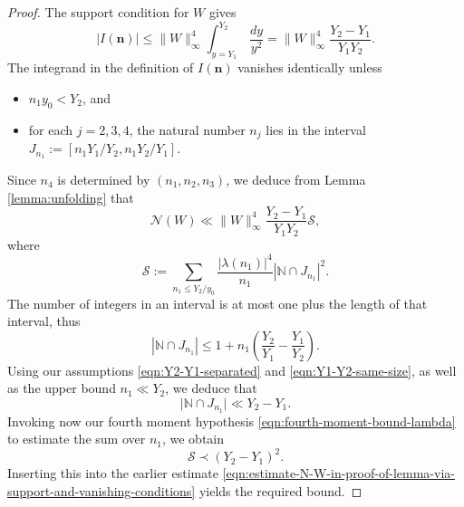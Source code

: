 \documentclass[reqno]{amsart} 
\begin{document}
\begin{proof}
  The support condition for $W$ gives
  \begin{equation*}
    \lvert I(\mathbf{n}) \rvert \leq \lVert W \rVert_{\infty}^4
    \int _{y = Y_1} ^{Y_2}  \, \frac{d y}{y^2}
    =  \lVert W \rVert_{\infty}^4 \frac{Y_2 - Y_1}{Y_1 Y_2}.
  \end{equation*}
  The integrand in the definition of $I(\mathbf{n})$ vanishes identically unless
  \begin{itemize}
  \item $n_1 y_0 < Y_2$, and
  \item for each $j=2,3,4$, the natural number $n_j$ lies in the interval $J_{n_1} := [n_1 Y_1/Y_2, n_1 Y_2/Y_1]$.
  \end{itemize}
  Since $n_4$ is determined by $(n_1,n_2,n_3)$, we deduce from Lemma \ref{lemma:unfolding} that
  \begin{equation}\label{eqn:estimate-N-W-in-proof-of-lemma-via-support-and-vanishing-conditions}
    \mathcal{N}(W)
    \ll
    \lVert W \rVert _\infty ^4
    \frac{Y_2 - Y_1}{ Y_1 Y_2}
    \mathcal{S}, 
  \end{equation}
  where
  \begin{equation*}
    \mathcal{S} := \sum _{n_1 \leq Y_2 / y_0} \frac{\left\lvert \lambda(n_1)  \right\rvert^4}{n_1}
    |\mathbb{N} \cap J_{n_1}|^2.
  \end{equation*}
  The number of integers in an interval is at most one plus the length of that interval, thus
  \begin{equation*}
    |\mathbb{N} \cap J_{n_1}|
    \leq 1 + n_1 \left( \frac{Y_2}{Y_1} - \frac{Y_1}{Y_2} \right).
  \end{equation*}
  Using our assumptions \eqref{eqn:Y2-Y1-separated} and \eqref{eqn:Y1-Y2-same-size}, as well as the upper bound $n_1 \ll Y_2$, we deduce that
  \begin{equation*}
    \lvert \mathbb{N} \cap J _{n _1} \rvert \ll Y_2 - Y_1.
  \end{equation*}
  Invoking now our fourth moment hypothesis \eqref{eqn:fourth-moment-bound-lambda} to estimate the sum over $n_1$, we obtain
  \begin{equation*}
    \mathcal{S} \prec (Y_2 - Y_1)^2.
  \end{equation*}
  Inserting this into the earlier estimate \eqref{eqn:estimate-N-W-in-proof-of-lemma-via-support-and-vanishing-conditions} yields the required bound.
\end{proof}
\end{document}
